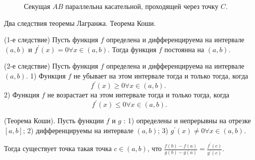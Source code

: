 \begin{figure}[h!]
    \caption{Секущая $AB$ параллельна касательной, проходящей через точку $C$.}
    \label{fig:image}
\end{figure}


\newpage

\begin{problem}
Два следствия теоремы Лагранжа. Теорема Коши.\end{problem}
\begin{proposition}
    (1-е следствие) Пусть функция $f$ определена и дифференцируема на интервале $(a, b)$ и $f^{\prime}(x)=0 \forall x \in(a, b)$. Тогда функция $f$ постоянна на $(a, b)$.
\end{proposition}

\begin{proposition}
    (2-е следствие) Пусть функция $f$ определена и дифференцируема на интервале $(a, b)$.
    1) Функция $f$ не убывает на этом интервале тогда и только тогда, когда
    $$
        f^{\prime}(x) \geq 0 \forall x \in(a, b) \text {. }
    $$
    2) Функция $f$ не возрастает на этом интервале тогда и только тогда, когда
    $$
        f^{\prime}(x) \leq 0 \forall x \in(a, b) .
    $$
\end{proposition}

\begin{theorem}
    (Теорема Коши). Пусть функции $f$ и $g$ :
    1) определены и непрерывны на отрезке $[a, b]$;
    2) дифференцируемы на интервале $(a, b)$;
    3) $g^{\prime}(x) \neq 0 \forall x \in(a, b)$.

    Тогда существует точка такая точка $c \in(a, b)$, что $\frac{f(b)-f(a)}{g(b)-g(a)}=\frac{f^{\prime}(c)}{g^{\prime}(c)}$.
\end{theorem}
